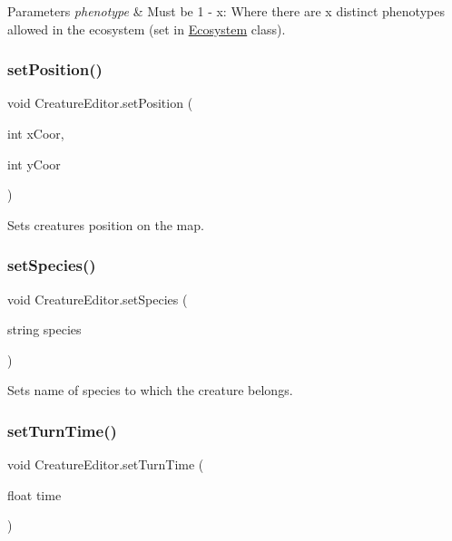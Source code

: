 \begin{DoxyParams}{Parameters}
{\em phenotype} & Must be 1 -\/ x\+: Where there are x distinct phenotypes allowed in the ecosystem (set in \mbox{\hyperlink{class_ecosystem}{Ecosystem}} class).\\
\hline
\end{DoxyParams}
\mbox{\label{class_creature_editor_af2c3731115defa893138dcb7de00092c}} 
\subsubsection{\texorpdfstring{set\+Position()}{setPosition()}}
{\footnotesize\ttfamily void Creature\+Editor.\+set\+Position (\begin{DoxyParamCaption}\item[{int}]{x\+Coor,  }\item[{int}]{y\+Coor }\end{DoxyParamCaption})}



Sets creature\textquotesingle{}s position on the map. 

\mbox{\label{class_creature_editor_a25dc6294586118bf7e4ecefeccea2815}} 
\subsubsection{\texorpdfstring{set\+Species()}{setSpecies()}}
{\footnotesize\ttfamily void Creature\+Editor.\+set\+Species (\begin{DoxyParamCaption}\item[{string}]{species }\end{DoxyParamCaption})}



Sets name of species to which the creature belongs. 

\mbox{\label{class_creature_editor_a89072895132cbeae88d530bada8c0761}} 
\subsubsection{\texorpdfstring{set\+Turn\+Time()}{setTurnTime()}}
{\footnotesize\ttfamily void Creature\+Editor.\+set\+Turn\+Time (\begin{DoxyParamCaption}\item[{float}]{time }\end{DoxyParamCaption})}



